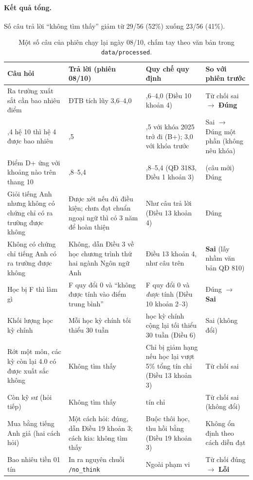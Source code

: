 \paragraph{Kết quả tổng.} Số câu trả lời ``không tìm thấy'' giảm từ 29/56 (52\%) xuống 23/56 (41\%).

\begin{table}[H]
  \centering
  \small
  \begin{tabularx}{\textwidth}{>{\hsize=0.9\hsize}X >{\hsize=1.1\hsize}X >{\hsize=1.1\hsize}X >{\hsize=0.9\hsize}X}
    \toprule
    \textbf{Câu hỏi} & \textbf{Trả lời (phiên 08/10)} & \textbf{Quy chế quy định} & \textbf{So với phiên trước} \\
    \midrule
    Ra trường xuất sắt cần bao nhiêu điểm & ĐTB tích lũy 3,6--4,0 & 3,6--4,0 (Điều 10 khoản 4) & Từ chối sai $\to$ \textbf{Đúng} \\
    8,4 hệ 10 thì hệ 4 được bao nhiêu & 3,5 & 3,5 với khóa 2025 trở đi (B+); 3,0 với khóa trước & Sai $\to$ Đúng một phần (không nêu khóa) \\
    Điểm D+ ứng với khoảng nào trên thang 10 & 4,8--5,4 & 4,8--5,4 (QĐ 3183, Điều 1 khoản 3) & (câu mới) Đúng \\
    Giỏi tiếng Anh nhưng không có chứng chỉ có ra trường được không & Được xét nếu đủ điều kiện; chưa đạt chuẩn ngoại ngữ thì có 3 năm để hoàn thiện & Như câu trả lời (Điều 13 khoản 4) & Đúng \\
    \midrule
    Không có chứng chỉ tiếng Anh có ra trường được không & Không, dẫn Điều 3 về học chương trình thứ hai ngành Ngôn ngữ Anh & Điều 13 khoản 4, như câu trên & \textbf{Sai} (lấy nhầm văn bản QĐ 810) \\
    Học bị F thì làm gì & F quy đổi 0 và ``không được tính vào điểm trung bình'' & F quy đổi 0 và \emph{được} tính (Điều 10 khoản 2--3) & Đúng $\to$ \textbf{Sai} \\
    Khối lượng học kỳ chính & Mỗi học kỳ chính tối thiểu 30 tuần & 2 học kỳ chính cộng lại tối thiểu 30 tuần (Điều 6) & Sai (không đổi) \\
    Rớt một môn, các kỳ còn lại 4.0 có được xuất sắc không & Không tìm thấy & Chỉ bị giảm hạng nếu học lại vượt 5\% tổng tín chỉ (Điều 13 khoản 3) & Từ chối sai \\
    Còn kỹ sư (hỏi tiếp) & Không tìm thấy & 150 tín chỉ & Từ chối sai (không đổi) \\
    \midrule
    Mua bằng tiếng Anh giả (hai cách hỏi) & Một cách hỏi: đúng, dẫn Điều 19 khoản 3; cách kia: không tìm thấy & Buộc thôi học, thu hồi bằng (Điều 19 khoản 3) & Không ổn định theo cách diễn đạt \\
    Bao nhiêu tiền 01 tín & In ra nguyên chuỗi \texttt{/no\_think} & Ngoài phạm vi & Từ chối đúng $\to$ \textbf{Lỗi} \\
    \bottomrule
  \end{tabularx}
  \caption{Một số câu của phiên chạy lại ngày 08/10, chấm tay theo văn bản trong \texttt{data/processed}.}
  \label{tab:chay-lai-56-cau}
\end{table}

